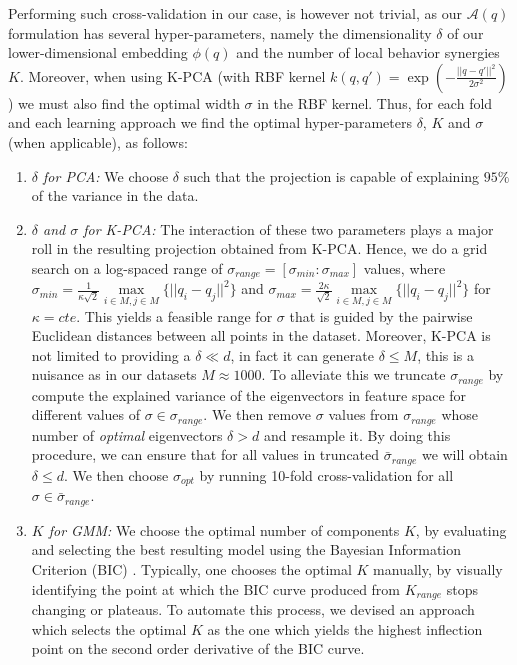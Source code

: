 \documentclass[letterpaper, 10 pt, conference,fleqn]{ieeeconf}
\begin{document}
Performing such cross-validation in our case, is however not trivial, as our $\mathcal{A}(q)$ formulation has several hyper-parameters, namely the dimensionality $\delta$ of our lower-dimensional embedding $\phi(q)$ and the number of local behavior synergies $K$. Moreover, when using K-PCA (with RBF kernel $k(q,q') = \exp(-\frac{||q-q'||^2}{2\sigma^2})$) we must also find the optimal width $\sigma$ in the RBF kernel. Thus, for each fold and each learning approach we find the optimal hyper-parameters $\delta$, $K$ and $\sigma$ (when applicable), as follows:
\begin{enumerate}[leftmargin=*]
\item \textit{$\delta$ for PCA:} We choose $\delta$ such that the projection is capable of explaining $95\%$ of the variance in the data.
\item \textit{$\delta$ and $\sigma$ for K-PCA:} The interaction of these two parameters plays a major roll in the resulting projection obtained from K-PCA. Hence, we do a grid search on a log-spaced range of $\sigma_{range} = [\sigma_{min}:\sigma_{max}]$ values, where 
$\sigma_{min} = \frac{1}{\kappa\sqrt{2}} \underset{i \in M,j\in M}{\max}\{||q_i - q_j||^2\}$ and $\sigma_{max} = \frac{2\kappa}{\sqrt{2}} \underset{i \in M,j\in M}{\max}\{||q_i - q_j||^2\}$ for $\kappa = cte.$ This yields a feasible range for $\sigma$ that is guided by the pairwise Euclidean distances between all points in the dataset. Moreover, K-PCA is not limited to providing a $\delta \ll d$, in fact it can generate $\delta \le M$, this is a nuisance as in our datasets $M\approx1000$. To alleviate this we truncate $\sigma_{range}$ by compute the explained variance of the eigenvectors in feature space for different values of  $\sigma \in \sigma_{range}$. We then remove $\sigma$ values from $\sigma_{range}$ whose number of \textit{optimal} eigenvectors $\delta > d$ and resample it. By doing this procedure, we can ensure that for all values in truncated $\bar{\sigma}_{range}$ we will obtain $\delta \le d$. We then choose $\sigma_{opt}$ by running 10-fold cross-validation for all $\sigma \in \bar{\sigma}_{range}$. 
\item \textit{$K$ for GMM:} We choose the optimal number of components $K$, by evaluating and selecting the best resulting model using the Bayesian Information Criterion (BIC) \cite{Bishop:PRM:2006}. Typically, one chooses the optimal $K$ manually, by visually identifying the point at which the BIC curve produced from $K_{range}$ stops changing or plateaus. To automate this process, we devised an approach which selects the optimal $K$ as the one which yields the highest inflection point on the second order derivative of the BIC curve.
\end{enumerate}
\end{document}
